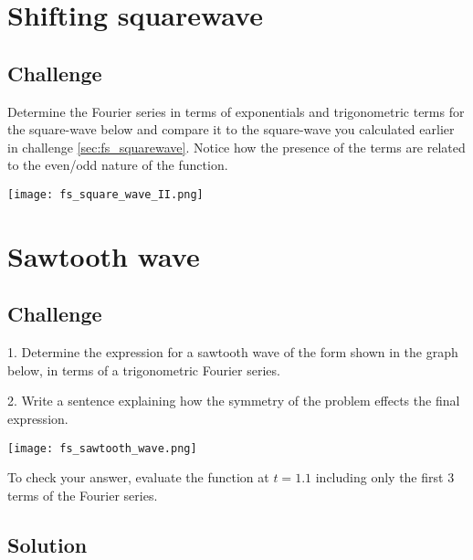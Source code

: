 \newpage
\section{Shifting squarewave} 

\subsection*{Challenge}
Determine the Fourier series in terms of exponentials and trigonometric terms for the square-wave below and compare it to the square-wave you calculated earlier in challenge \ref{sec:fs_squarewave}. Notice how the presence of the terms are related to the even/odd nature of the function.

\texttt{[image: fs\_square\_wave\_II.png]}




\newpage
\section{Sawtooth wave} 
\label{sec:sawtooth}

\subsection*{Challenge}
1. Determine the expression for a sawtooth wave of the form shown in the graph below, in terms of a trigonometric Fourier series.

2. Write a sentence explaining how the symmetry of the problem effects the final expression.

\texttt{[image: fs\_sawtooth\_wave.png]}

To check your answer, evaluate the function at $t=1.1$ including only the first 3 terms of the Fourier series.

\subsection*{Solution}
